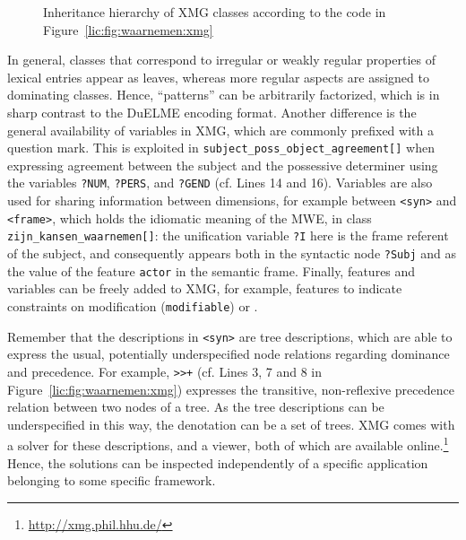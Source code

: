 \documentclass[output=paper
,modfonts
,nonflat
,biblatexbackend=biber
]{langsci/langscibook}
\begin{document}
\begin{figure}
  \centering
  \caption{Inheritance hierarchy of XMG classes according to the code in Figure~\ref{lic:fig:waarnemen:xmg}}
  \label{lic:fig:waarnemen:xmg:hierarchy}
\end{figure} 

In general, classes that correspond to irregular or weakly regular properties of lexical entries appear as leaves, whereas more regular aspects are assigned to dominating classes. Hence, ``patterns'' can be arbitrarily factorized, which is in sharp contrast to the DuELME encoding format. Another difference is the general availability of variables in XMG, which are commonly prefixed with a question mark. This is exploited in \texttt{subject\_poss\_object\_agreement[]} when expressing agreement between the subject and the possessive determiner using the variables \texttt{?NUM}, \texttt{?PERS}, and \texttt{?GEND} (cf. Lines 14 and 16). Variables are also used for sharing information between dimensions, for example between \texttt{<syn>} and \texttt{<frame>}, which holds the idiomatic meaning of the MWE, in class \texttt{zijn\_kansen\_waarnemen[]}: the unification variable \texttt{?I} here is the frame referent of the subject, and consequently appears both in the syntactic node \texttt{?Subj} and as the value of the feature \texttt{actor} in the semantic frame. Finally, features and variables can be freely added to XMG, for example, features to indicate constraints on modification (\texttt{modifiable}) or .

Remember that the descriptions in \texttt{<syn>} are tree descriptions, which are able to express the usual, potentially underspecified node relations regarding dominance and precedence. For example, \texttt{>{}>+} (cf. Lines 3, 7 and 8 in Figure~\ref{lic:fig:waarnemen:xmg}) expresses the transitive, non-reflexive precedence relation between two nodes of a tree. As the tree descriptions can be underspecified in this way, the denotation can be a set of trees. XMG comes with a solver for these descriptions, and a viewer, both of which are available online.\footnote{\url{http://xmg.phil.hhu.de/}} Hence, the solutions can be inspected independently of a specific application belonging to some specific framework.
\end{document}
